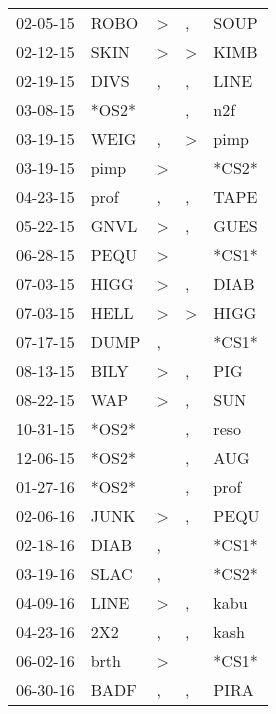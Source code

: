 \begin{supertabular}{lllll}
 02-05-15 &   ROBO &     \textgreater &                , &   SOUP \\
 02-12-15 &   SKIN &     \textgreater &     \textgreater &   KIMB \\
 02-19-15 &   DIVS &                , &                , &   LINE \\
 03-08-15 &  *OS2* &                  &                , &    n2f \\
 03-19-15 &   WEIG &                , &     \textgreater &   pimp \\
 03-19-15 &   pimp &     \textgreater &                  &  *CS2* \\
 04-23-15 &   prof &                , &                , &   TAPE \\
 05-22-15 &   GNVL &     \textgreater &                , &   GUES \\
 06-28-15 &   PEQU &     \textgreater &                  &  *CS1* \\
 07-03-15 &   HIGG &     \textgreater &                , &   DIAB \\
 07-03-15 &   HELL &     \textgreater &     \textgreater &   HIGG \\
 07-17-15 &   DUMP &                , &                  &  *CS1* \\
 08-13-15 &   BILY &     \textgreater &                , &    PIG \\
 08-22-15 &    WAP &     \textgreater &                , &    SUN \\
 10-31-15 &  *OS2* &                  &                , &   reso \\
 12-06-15 &  *OS2* &                  &                , &    AUG \\
 01-27-16 &  *OS2* &                  &                , &   prof \\
 02-06-16 &   JUNK &     \textgreater &                , &   PEQU \\
 02-18-16 &   DIAB &                , &                  &  *CS1* \\
 03-19-16 &   SLAC &                , &                  &  *CS2* \\
 04-09-16 &   LINE &     \textgreater &                , &   kabu \\
 04-23-16 &    2X2 &                , &                , &   kash \\
 06-02-16 &   brth &     \textgreater &                  &  *CS1* \\
 06-30-16 &   BADF &                , &                , &   PIRA \\

\end{supertabular}
